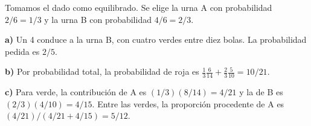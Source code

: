 Tomamos el dado como equilibrado. Se elige la urna A con
probabilidad $2/6=1/3$ y la urna B con probabilidad $4/6=2/3$.

\textbf{a)} Un 4 conduce a la urna B, con cuatro verdes entre
diez bolas. La probabilidad pedida es $\boxed{2/5}$.

\textbf{b)} Por probabilidad total, la probabilidad de roja es
$\frac13\frac6{14}+\frac23\frac5{10}=\boxed{10/21}$.

\textbf{c)} Para verde, la contribución de A es
$(1/3)(8/14)=4/21$ y la de B es $(2/3)(4/10)=4/15$.
Entre las verdes, la proporción procedente de A es
$\boxed{(4/21)/(4/21+4/15)=5/12}$.
